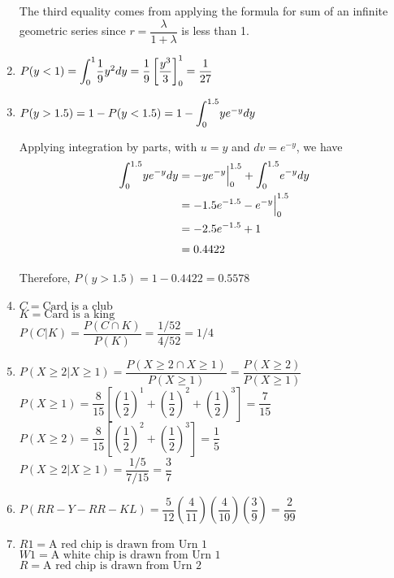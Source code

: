\documentclass{article}
\newcommand\mfrac[2]{\left(\dfrac{#1}{#2}\right)}
\newcommand\lint{\mathlarger{\int}}
\begin{document}
\begin{enumerate}
      The third equality comes from applying the formula for sum of an infinite geometric series
      since $r = \dfrac{\lambda}{1+\lambda}$ is less than 1.
     
     \item
      $P(y < 1) = \lint_0^1 {\dfrac{1}{9}y^2 dy} = \dfrac{1}{9} \left[\dfrac{y^3}{3}\right]_0^1
	 = \dfrac{1}{27}$
     
     \item
      $P(y > 1.5) = 1 - P(y < 1.5) = 1 - \lint_0^{1.5}{ye^{-y} dy}$
      
      Applying integration by parts, with $u = y$ and $dv = e^{-y}$, we have
      \begin{align*}
       \lint_0^{1.5}{ye^{-y} dy} &= -ye^{-y}\Big|_0^{1.5} + \lint_0^{1.5}{e^{-y} dy} \\
	  &= -1.5e^{-1.5} - e^{-y}\Big|_0^{1.5} \\
	  &= -2.5e^{-1.5} + 1 \\
	  &= 0.4422
      \end{align*}
      
      Therefore, $P(y > 1.5) = 1 - 0.4422 = 0.5578$

     
     \item
      $C = \text{Card is a club}$\\
      $K = \text{Card is a king}$\\
      $P(C | K) = \dfrac{P(C \cap K)}{P(K)} = \dfrac{1/52}{4/52} = 1/4$
     
     \item
      $P(X \ge 2 | X \ge 1) = \dfrac{P(X \ge 2 \cap X \ge 1)}{P(X \ge 1)} 
	  = \dfrac{P(X \ge 2)}{P(X \ge 1)}$ \\
	  
      $P(X \ge 1) = \dfrac{8}{15} \left[ \mfrac{1}{2}^1 + \mfrac{1}{2}^2 + \mfrac{1}{2}^3 \right] 
	= \dfrac{7}{15}$ \\
      $P(X \ge 2) = \dfrac{8}{15} \left[ \mfrac{1}{2}^2 + \mfrac{1}{2}^3 \right]
	= \dfrac{1}{5}$ \\
	
      $P(X \ge 2 | X \ge 1) = \dfrac{1/5}{7/15} = \dfrac{3}{7}$
      
     \item
      $P( RR-Y-RR-KL ) = \dfrac{5}{12}\mfrac{4}{11}\mfrac{4}{10}\mfrac{3}{9} = \dfrac{2}{99}$
     
     \item
      $R1 = \text{A red chip is drawn from Urn 1}$\\
      $W1 = \text{A white chip is drawn from Urn 1}$\\
      $R = \text{A red chip is drawn from Urn 2}$\\
      

\end{enumerate}
\end{document}
